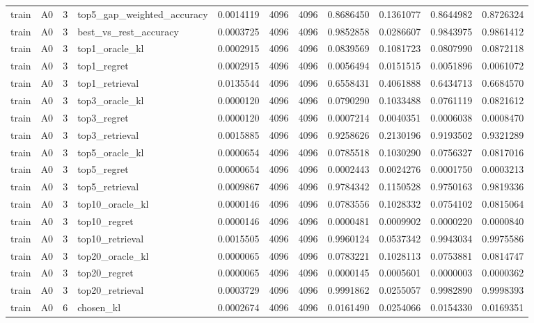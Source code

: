 \begin{tabular}{llrlrrrrrrr}
train & A0 & 3 & top5_gap_weighted_accuracy & 0.0014119 & 4096 & 4096 & 0.8686450 & 0.1361077 & 0.8644982 & 0.8726324 \\
train & A0 & 3 & best_vs_rest_accuracy & 0.0003725 & 4096 & 4096 & 0.9852858 & 0.0286607 & 0.9843975 & 0.9861412 \\
train & A0 & 3 & top1_oracle_kl & 0.0002915 & 4096 & 4096 & 0.0839569 & 0.1081723 & 0.0807990 & 0.0872118 \\
train & A0 & 3 & top1_regret & 0.0002915 & 4096 & 4096 & 0.0056494 & 0.0151515 & 0.0051896 & 0.0061072 \\
train & A0 & 3 & top1_retrieval & 0.0135544 & 4096 & 4096 & 0.6558431 & 0.4061888 & 0.6434713 & 0.6684570 \\
train & A0 & 3 & top3_oracle_kl & 0.0000120 & 4096 & 4096 & 0.0790290 & 0.1033488 & 0.0761119 & 0.0821612 \\
train & A0 & 3 & top3_regret & 0.0000120 & 4096 & 4096 & 0.0007214 & 0.0040351 & 0.0006038 & 0.0008470 \\
train & A0 & 3 & top3_retrieval & 0.0015885 & 4096 & 4096 & 0.9258626 & 0.2130196 & 0.9193502 & 0.9321289 \\
train & A0 & 3 & top5_oracle_kl & 0.0000654 & 4096 & 4096 & 0.0785518 & 0.1030290 & 0.0756327 & 0.0817016 \\
train & A0 & 3 & top5_regret & 0.0000654 & 4096 & 4096 & 0.0002443 & 0.0024276 & 0.0001750 & 0.0003213 \\
train & A0 & 3 & top5_retrieval & 0.0009867 & 4096 & 4096 & 0.9784342 & 0.1150528 & 0.9750163 & 0.9819336 \\
train & A0 & 3 & top10_oracle_kl & 0.0000146 & 4096 & 4096 & 0.0783556 & 0.1028332 & 0.0754102 & 0.0815064 \\
train & A0 & 3 & top10_regret & 0.0000146 & 4096 & 4096 & 0.0000481 & 0.0009902 & 0.0000220 & 0.0000840 \\
train & A0 & 3 & top10_retrieval & 0.0015505 & 4096 & 4096 & 0.9960124 & 0.0537342 & 0.9943034 & 0.9975586 \\
train & A0 & 3 & top20_oracle_kl & 0.0000065 & 4096 & 4096 & 0.0783221 & 0.1028113 & 0.0753881 & 0.0814747 \\
train & A0 & 3 & top20_regret & 0.0000065 & 4096 & 4096 & 0.0000145 & 0.0005601 & 0.0000003 & 0.0000362 \\
train & A0 & 3 & top20_retrieval & 0.0003729 & 4096 & 4096 & 0.9991862 & 0.0255057 & 0.9982890 & 0.9998393 \\
train & A0 & 6 & chosen_kl & 0.0002674 & 4096 & 4096 & 0.0161490 & 0.0254066 & 0.0154330 & 0.0169351 \\

\end{tabular}
